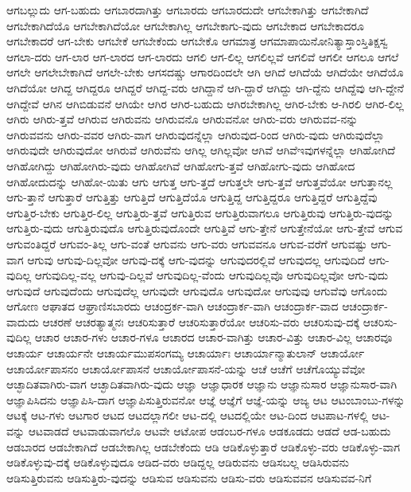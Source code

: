 {ಆಗಬಲ್ಲುದು
ಆಗ-ಬಹುದು
ಆಗಬಾರದಾಗಿತ್ತು
ಆಗಬಾರದು
ಆಗಬಾರದುದೇ
ಆಗಬೇಕಾಗಿತ್ತು
ಆಗಬೇಕಾಗಿದೆ
ಆಗಬೇಕಾಗಿದೆಯೊ
ಆಗಬೇಕಾಗಿದೆಯೋ
ಆಗಬೇಕಾಗಿಲ್ಲ
ಆಗಬೇಕಾಗು-ವುದು
ಆಗಬೇಕಾದ
ಆಗಬೇಕಾದರೂ
ಆಗಬೇಕಾದರೆ
ಆಗ-ಬೇಕು
ಆಗಬೇಕೆ
ಆಗಬೇಕೆಂದು
ಆಗಬೇಕೊ
ಆಗಮಾತ್ರ
ಆಗಮಾಪಾಯಿನೋನಿತ್ಯಾಸ್ತಾಂಸ್ತಿತಿಕ್ಷಸ್ವ
ಆಗಲಾ-ದರು
ಆಗ-ಲಾರ
ಆಗ-ಲಾರದ
ಆಗ-ಲಾರದು
ಆಗಲಿ
ಆಗ-ಲಿಲ್ಲ
ಆಗಲಿಲ್ಲವೆ
ಆಗಲಿವೆ
ಆಗಲೀ
ಆಗಲೂ
ಆಗಲೆ
ಆಗಲೇ
ಆಗಲೇಬೇಕಾಗಿದೆ
ಆಗಲೇ-ಬೇಕು
ಆಗಸದಷ್ಚು
ಆಗಾರದಿಂದಲೇ
ಆಗಿ
ಆಗಿದೆ
ಆಗಿದೆಯೆ
ಆಗಿದೆಯೇ
ಆಗಿದೆಯೊ
ಆಗಿದೆಯೋ
ಆಗಿದ್ದ
ಆಗಿದ್ದರೂ
ಆಗಿದ್ದರೆ
ಆಗಿದ್ದ-ವರು
ಆಗಿದ್ದಾನೆ
ಆಗಿ-ದ್ದಾರೆ
ಆಗಿದ್ದು
ಆಗಿ-ದ್ದೆನು
ಆಗಿದ್ದೆವು
ಆಗಿ-ದ್ದೇನೆ
ಆಗಿದ್ದೇವೆ
ಆಗಿನ
ಆಗಿಬಿಡುವನೆ
ಆಗಿಯೇ
ಆಗಿರ
ಆಗಿರ-ಬಹುದು
ಆಗಿರಬೇಕಾಗಿಲ್ಲ
ಆಗಿರ-ಬೇಕು
ಆ-ಗಿರಲಿ
ಆಗಿರ-ಲಿಲ್ಲ
ಆಗಿರು
ಆಗಿರು-ತ್ತವೆ
ಆಗಿರುವ
ಆಗಿರುವನು
ಆಗಿರುವನೊ
ಆಗಿರುವನೋ
ಆಗಿರು-ವರು
ಆಗಿರುವವ-ನನ್ನು
ಆಗಿರುವವನು
ಆಗಿರು-ವವರ
ಆಗಿರು-ವಾಗ
ಆಗಿರುವುದನ್ನೆಲ್ಲಾ
ಆಗಿರುವುದ-ರಿಂದ
ಆಗಿರು-ವುದು
ಆಗಿರುವುದೆಲ್ಲಾ
ಆಗಿರುವುದೇ
ಆಗಿರುವುದೋ
ಆಗಿರುವೆ
ಆಗಿರುವೆನು
ಆಗಿಲ್ಲ
ಆಗಿಲ್ಲವೋ
ಆಗಿವೆ
ಆಗಿವೆಇವುಗಳನ್ನೆಲ್ಲಾ
ಆಗಿಹೋಗಿದೆ
ಆಗಿಹೋಗಿದ್ದು
ಆಗಿಹೋಗಿರು-ವುದು
ಆಗಿಹೋಗಿವೆ
ಆಗಿಹೋಗು-ತ್ತವೆ
ಆಗಿಹೋಗು-ವುದು
ಆಗಿಹೋದ
ಆಗಿಹೋದುದನ್ನು
ಆಗಿಹೋ-ಯಿತು
ಆಗು
ಆಗುತ್ತ
ಆಗು-ತ್ತದೆ
ಆಗುತ್ತಲೇ
ಆಗು-ತ್ತವೆ
ಆಗುತ್ತವೆಯೋ
ಆಗುತ್ತಾನಲ್ಲ
ಆಗು-ತ್ತಾನೆ
ಆಗುತ್ತಾರೆ
ಆಗುತ್ತಿತ್ತು
ಆಗುತ್ತಿದೆ
ಆಗುತ್ತಿದೆಯೊ
ಆಗುತ್ತಿದ್ದ
ಆಗುತ್ತಿದ್ದರೂ
ಆಗುತ್ತಿದ್ದರೆ
ಆಗುತ್ತಿದ್ದೆವು
ಆಗುತ್ತಿರ-ಬೇಕು
ಆಗುತ್ತಿರ-ಲಿಲ್ಲ
ಆಗುತ್ತಿರು-ತ್ತವೆ
ಆಗುತ್ತಿರುವ
ಆಗುತ್ತಿರುವಾಗಲೂ
ಆಗುತ್ತಿರುವು
ಆಗುತ್ತಿರು-ವುದನ್ನು
ಆಗುತ್ತಿರು-ವುದು
ಆಗುತ್ತಿರುವುದೊ
ಆಗುತ್ತಿರುವುದೊಂದೇ
ಆಗುತ್ತಿವೆ
ಆಗು-ತ್ತೇನೆ
ಆಗುತ್ತೇನೆಯೋ
ಆಗು-ತ್ತೇವೆ
ಆಗುವ
ಆಗುವಂತಿದ್ದರೆ
ಆಗುವಂ-ತಿಲ್ಲ
ಆಗು-ವಂತೆ
ಆಗುವನು
ಆಗು-ವರು
ಆಗುವವನೂ
ಆಗುವ-ವರೆಗೆ
ಆಗುವಷ್ಟು
ಆಗು-ವಾಗ
ಆಗುವು
ಆಗುವು-ದಿಲ್ಲವೋ
ಆಗುವು-ದಕ್ಕೆ
ಆಗು-ವುದನ್ನು
ಆಗುವುದರಲ್ಲಿವೆ
ಆಗುವುದಲ್ಲ
ಆಗುವುದಿದೆ
ಆಗು-ವುದಿಲ್ಲ
ಆಗುವುದಿಲ್ಲ-ವಲ್ಲ
ಆಗುವು-ದಿಲ್ಲವೆ
ಆಗುವುದಿಲ್ಲ-ವೆಂದು
ಆಗುವುದಿಲ್ಲವೊ
ಆಗುವುದಿಲ್ಲವೋ
ಆಗು-ವುದು
ಆಗುವುದೆ
ಆಗುವುದೆಂದು
ಆಗುವುದೆಲ್ಲ
ಆಗುವುದೇ
ಆಗುವುದೊ
ಆಗುವುದೋ
ಆಗುವುವು
ಆಗುವೆವು
ಆಗೊಂದು
ಆಗೋಣ
ಆಘಾತದ
ಆಘ್ರಾಣಿಸಬಾರದು
ಆಚಂದ್ರರ್ಕ-ವಾಗಿ
ಆಚಂದ್ರಾರ್ಕ-ವಾಗಿ
ಆಚಂದ್ರಾರ್ಕ-ವಾದ
ಆಚಂದ್ರಾರ್ಕ-ವಾದುದು
ಆಚರಣೆ
ಆಚರತ್ಯಾತ್ಮನಃ
ಆಚರಿಸುತ್ತಾರೆ
ಆಚರಿಸುತ್ತಾರೆಯೋ
ಆಚರಿಸು-ವರು
ಆಚರಿಸುವು-ದಕ್ಕೆ
ಆಚರಿಸು-ವುದಿಲ್ಲ
ಆಚಾರ
ಆಚಾರ-ಗಳು
ಆಚಾರ-ಗಳೂ
ಆಚಾರದ
ಆಚಾರ-ವಾಗಿತ್ತು
ಆಚಾರ-ವಿತ್ತು
ಆಚಾರ-ವಿಲ್ಲ
ಆಚಾರವೂ
ಆಚಾರ್ಯ
ಆಚಾರ್ಯನೇ
ಆಚಾರ್ಯಮುಪಸಂಗಮ್ಯ
ಆಚಾರ್ಯಾಃ
ಆಚಾರ್ಯಾನ್ಮಾತುಲಾನ್
ಆಚಾರ್ಯೋ
ಆಚಾರ್ಯೋಪಾಸನಂ
ಆಚಾರ್ಯೋಪಾಸನೆ
ಆಚಾರ್ಯೋಪಾಸನೆ-ಯನ್ನು
ಆಚೆ
ಆಚೆಗೆ
ಆಚೆಗೊಯ್ಯುವೆವೋ
ಆಚ್ಛಾದಿತವಾಗಿರು-ವಾಗ
ಆಚ್ಛಾದಿತವಾಗಿರು-ವುದು
ಆಜ್ಞಾ
ಆಜ್ಞಾಧಾರಕ
ಆಜ್ಞಾನು
ಆಜ್ಞಾನುಸಾರ
ಆಜ್ಞಾನುಸಾರ-ವಾಗಿ
ಆಜ್ಞಾಪಿಸಿದನು
ಆಜ್ಞಾಪಿಸಿ-ದಾಗ
ಆಜ್ಞಾಪಿಸುತ್ತಿರುವನೋ
ಆಜ್ಞೆ
ಆಜ್ಞೆಗೆ
ಆಜ್ಞೆ-ಯನ್ನು
ಆಜ್ಯ
ಆಟ
ಆಟಂಬಾಂಬು-ಗಳನ್ನು
ಆಟಕ್ಕೆ
ಆಟ-ಗಳು
ಆಟಗಾರ
ಆಟದ
ಆಟದಲ್ಲಾಗಲೀ
ಆಟ-ದಲ್ಲಿ
ಆಟದಲ್ಲಿಯೇ
ಆಟ-ದಿಂದ
ಆಟಪಾಟ-ಗಳಲ್ಲಿ
ಆಟ-ವನ್ನು
ಆಟವಾಡದೆ
ಆಟವಾಡುವಾಗಲೊ
ಆಟವೇ
ಆಟೋಪ
ಆಡಂಬರ-ಗಳೂ
ಆಡಕೂಡದು
ಆಡದೆ
ಆಡ-ಬಹುದು
ಆಡಬಾರದ
ಆಡಬೇಕಾಗಿದೆ
ಆಡಬೇಕಾಗಿಲ್ಲ
ಆಡಬೇಕೆಂದು
ಆಡಿ
ಆಡಿಕೊಳ್ಳುತ್ತಾರೆ
ಆಡಿಕೊಳ್ಳು-ವರು
ಆಡಿಕೊಳ್ಳು-ವಾಗ
ಆಡಿಕೊಳ್ಳುವು-ದಕ್ಕೆ
ಆಡಿಕೊಳ್ಳುವುದೂ
ಆಡಿದ-ವರು
ಆಡಿದ್ದಲ್ಲ
ಆಡಿರುವನು
ಆಡಿಸಬಲ್ಲ
ಆಡಿಸಿರುವನು
ಆಡಿಸುತ್ತಿರುವನು
ಆಡಿಸುತ್ತಿರು-ವುದನ್ನು
ಆಡಿಸುವ
ಆಡಿಸುವನು
ಆಡಿಸು-ವರು
ಆಡಿಸುವವನ
ಆಡಿಸುವವ-ನಿಗೆ
}
